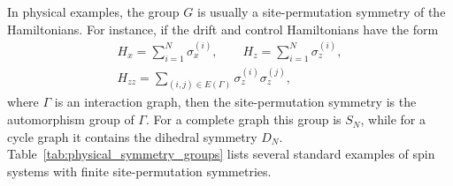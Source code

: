 \documentclass[10pt,twocolumn,superscriptaddress,aps,amsmath,amssymb,citeautoscript,floatfix,prx,longbibliography]{revtex4-2}
\theoremstyle{plain}
\theoremstyle{plain}
\theoremstyle{plain}
\theoremstyle{plain}
\theoremstyle{plain}
\theoremstyle{plain}
\begin{document}
In physical examples, the group $G$ is usually a site-permutation symmetry of the Hamiltonians. For instance, if the drift and control Hamiltonians have the form
$$
\begin{gathered}
    H_x
    =
    \sum_{i=1}^N\sigma_x^{(i)},
    \qquad
    H_z
    =
    \sum_{i=1}^N\sigma_z^{(i)},
    \\
    H_{zz}
    =
    \sum_{(i,j)\in E(\Gamma)}
    \sigma_z^{(i)}\sigma_z^{(j)},
\end{gathered}
$$
where $\Gamma$ is an interaction graph, then the site-permutation symmetry is the automorphism group of $\Gamma$. For a complete graph this group is $S_N$, while for a cycle graph it contains the dihedral symmetry $D_N$. Table~\ref{tab:physical_symmetry_groups} lists several standard examples of spin systems with finite site-permutation symmetries.
\end{document}
